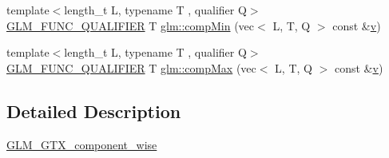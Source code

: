 \begin{DoxyCompactItemize}
\item 
{\footnotesize template$<$length\+\_\+t L, typename T , qualifier Q$>$ }\\\hyperlink{setup_8hpp_a33fdea6f91c5f834105f7415e2a64407}{G\+L\+M\+\_\+\+F\+U\+N\+C\+\_\+\+Q\+U\+A\+L\+I\+F\+I\+ER} T \hyperlink{namespaceglm_a10ecfac6e963c12a5e470233798de5aa}{glm\+::comp\+Min} (vec$<$ L, T, Q $>$ const \&\hyperlink{_s_d_l__opengl_8h_a10a82eabcb59d2fcd74acee063775f90}{v})
\item 
{\footnotesize template$<$length\+\_\+t L, typename T , qualifier Q$>$ }\\\hyperlink{setup_8hpp_a33fdea6f91c5f834105f7415e2a64407}{G\+L\+M\+\_\+\+F\+U\+N\+C\+\_\+\+Q\+U\+A\+L\+I\+F\+I\+ER} T \hyperlink{namespaceglm_a0d4cda53cef1caae2fb974492b2e81df}{glm\+::comp\+Max} (vec$<$ L, T, Q $>$ const \&\hyperlink{_s_d_l__opengl_8h_a10a82eabcb59d2fcd74acee063775f90}{v})
\end{DoxyCompactItemize}


\subsection{Detailed Description}
\hyperlink{group__gtx__component__wise}{G\+L\+M\+\_\+\+G\+T\+X\+\_\+component\+\_\+wise} 